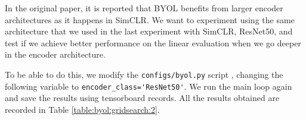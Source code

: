 In the original paper, it is reported that BYOL benefits from larger encoder architectures as it happens in SimCLR. We want to experiment using the same architecture that we used in the last experiment with SimCLR, ResNet50, and test if we achieve better performance on the linear evaluation when we go deeper in the encoder architecture.

To be able to do this, we modify the \lstinline{configs/byol.py} script , changing the following variable to \lstinline{encoder_class='ResNet50'}. We run the main loop again and save the results using tensorboard records. All the results obtained are recorded in Table \ref{table:byol:gridsearch:2}.

\begin{table}[H]
    \caption{All results for BYOL's experiment on the influence of the encoder architecture.}
\label{table:byol:gridsearch:2}
    \end{table}

\begin{table}[H]
    \caption{Results of the best models in both first and second experiments with BYOL.}
    \label{table:byol:exp2:comparison}
    \end{table}

